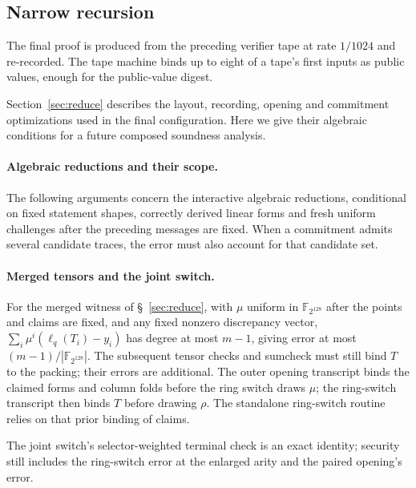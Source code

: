 \documentclass[11pt]{article}
\newcommand{\F}{\mathbb{F}_{2^{128}}}
\begin{document}
\subsection{Narrow recursion}\label{app:recursion}

The final proof is produced from the preceding verifier tape at rate $1/1024$ and re-recorded. The tape machine binds up to eight of a tape's first inputs as
public values, enough for the public-value digest.

Section~\ref{sec:reduce} describes the layout, recording, opening and
commitment optimizations used in the final configuration. Here we give their
algebraic conditions for a future composed soundness analysis.

\paragraph{Algebraic reductions and their scope.}
The following arguments concern the interactive algebraic
reductions, conditional on fixed statement shapes, correctly derived linear
forms and fresh uniform challenges after the preceding messages are fixed.
When a commitment admits several candidate
traces, the error must also account for that candidate set.

\paragraph{Merged tensors and the joint switch.}
For the merged witness of \S~\ref{sec:reduce}, with $\mu$ uniform in $\F$
after the points and claims are fixed, and any fixed nonzero discrepancy vector,
$\sum_i\mu^i(\ell_q(T_i)-y_i)$ has degree at most $m-1$, giving error at most
$(m-1)/|\F|$. The subsequent tensor checks and sumcheck must still bind $T$ to
the packing; their errors are additional. The outer opening transcript binds the claimed forms and column folds
before the ring switch draws $\mu$; the ring-switch transcript then binds
$T$ before drawing $\rho$. The standalone ring-switch routine relies on that
prior binding of claims.

The joint switch's selector-weighted terminal check is an exact identity;
security still includes the ring-switch error at the enlarged
arity and the paired opening's error.
\end{document}
